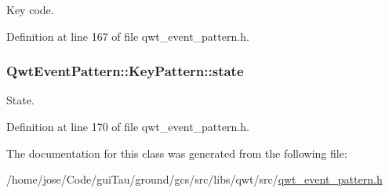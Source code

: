 Key code. 



Definition at line 167 of file qwt\-\_\-event\-\_\-pattern.\-h.

\hypertarget{class_qwt_event_pattern_1_1_key_pattern_a44033aa9ff7c151fc6e7968f08734926}{
\subsubsection[{state}]{ Qwt\-Event\-Pattern\-::\-Key\-Pattern\-::state}}\label{class_qwt_event_pattern_1_1_key_pattern_a44033aa9ff7c151fc6e7968f08734926}


State. 



Definition at line 170 of file qwt\-\_\-event\-\_\-pattern.\-h.



The documentation for this class was generated from the following file\-:\begin{DoxyCompactItemize}
\item 
/home/jose/\-Code/gui\-Tau/ground/gcs/src/libs/qwt/src/\hyperlink{qwt__event__pattern_8h}{qwt\-\_\-event\-\_\-pattern.\-h}\end{DoxyCompactItemize}
